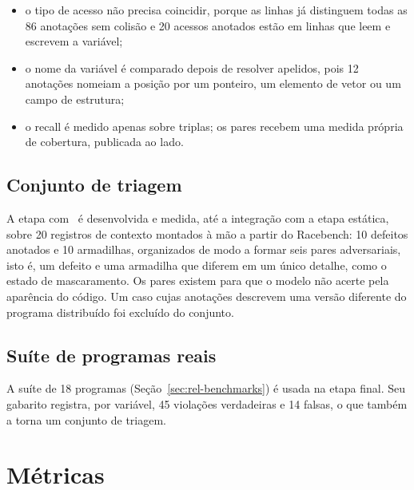 \begin{itemize}
  \item o tipo de acesso não precisa coincidir, porque as linhas já distinguem
    todas as 86 anotações sem colisão e 20 acessos anotados estão em linhas que
    leem e escrevem a variável;
  \item o nome da variável é comparado depois de resolver apelidos, pois 12
    anotações nomeiam a posição por um ponteiro, um elemento de vetor ou um campo de estrutura;
  \item o recall é medido apenas sobre triplas; os pares recebem uma medida
    própria de cobertura, publicada ao lado.
\end{itemize}

\subsection{Conjunto de triagem}

A etapa com \llm\ é desenvolvida e medida, até a integração com a etapa
estática, sobre 20 registros de contexto montados à mão a partir do
Racebench: 10 defeitos anotados e 10 armadilhas, organizados de modo a formar
seis pares adversariais, isto é, um defeito e uma armadilha que diferem em um
único detalhe, como o estado de mascaramento. Os pares existem para que o modelo não
acerte pela aparência do código. Um caso cujas anotações descrevem uma versão
diferente do programa distribuído foi excluído do conjunto.

\subsection{Suíte de programas reais}

A suíte de 18 programas (Seção~\ref{sec:rel-benchmarks}) é usada na etapa final.
Seu gabarito registra, por variável, 45 violações verdadeiras e 14 falsas, o
que também a torna um conjunto de triagem.

\section{Métricas}
\label{sec:metricas}

